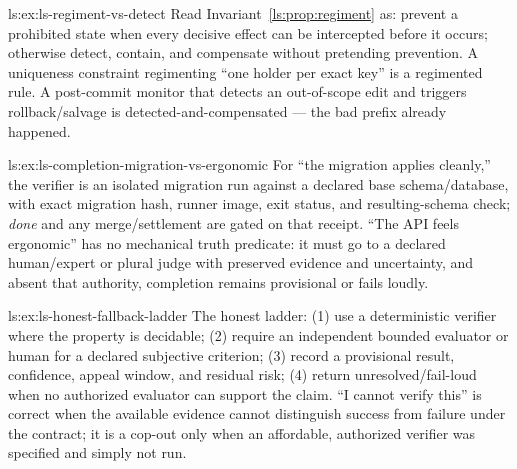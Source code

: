 \begin{pdSolution}{ls:ex:ls-regiment-vs-detect}
Read Invariant~\ref{ls:prop:regiment} as: prevent a prohibited state when every decisive effect can be intercepted before it occurs; otherwise detect, contain, and compensate without pretending prevention. A uniqueness constraint regimenting ``one holder per exact key'' is a regimented rule. A post-commit monitor that detects an out-of-scope edit and triggers rollback/salvage is detected-and-compensated --- the bad prefix already happened.
\end{pdSolution}
\begin{pdSolution}{ls:ex:ls-completion-migration-vs-ergonomic}
For ``the migration applies cleanly,'' the verifier is an isolated migration run against a declared base schema/database, with exact migration hash, runner image, exit status, and resulting-schema check; \emph{done} and any merge/settlement are gated on that receipt. ``The API feels ergonomic'' has no mechanical truth predicate: it must go to a declared human/expert or plural judge with preserved evidence and uncertainty, and absent that authority, completion remains provisional or fails loudly.
\end{pdSolution}
\begin{pdSolution}{ls:ex:ls-honest-fallback-ladder}
The honest ladder: (1) use a deterministic verifier where the property is decidable; (2) require an independent bounded evaluator or human for a declared subjective criterion; (3) record a provisional result, confidence, appeal window, and residual risk; (4) return unresolved/fail-loud when no authorized evaluator can support the claim. ``I cannot verify this'' is correct when the available evidence cannot distinguish success from failure under the contract; it is a cop-out only when an affordable, authorized verifier was specified and simply not run.
\end{pdSolution}
